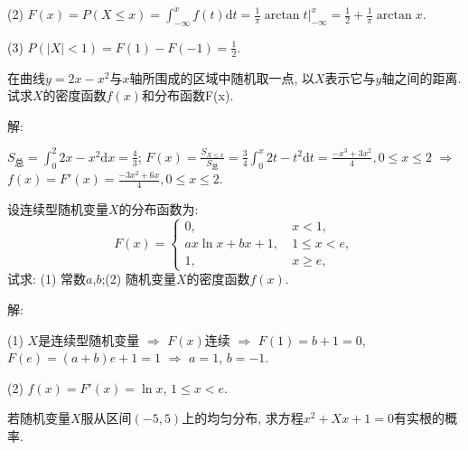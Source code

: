 \documentclass[standard]{ExBook}
\renewenvironment{shaded}{%
  \def\FrameCommand{\fboxsep=\FrameSep \colorbox{shadecolor}}%
  \MakeFramed{\advance\hsize-\width \FrameRestore}%
}{%
  \endMakeFramed
}
\begin{document}
\begin{qitems}
(2) $F(x)=P(X \leq x)=\displaystyle\int_{-\infty}^{x}f(t)\mathrm{d}t=\frac{1}{\pi}\arctan t\big|_{-\infty}^{x}=\frac{1}{2}+\frac{1}{\pi}\arctan x$.

(3) $P(|X| < 1)=F(1)-F(-1)=\displaystyle\frac{1}{2}$.

\vspace{2.5cm-5em}

    \begin{bbox}
    \begin{shaded}
        \qitem
在曲线$y=2x-x^2$与$x$轴所围成的区域中随机取一点, 以$X$表示它与$y$轴之间的距离. 试求$X$的密度函数$f(x)$和分布函数F(x).
    \end{shaded}
    \end{bbox}

\vspace{\dimexpr2.5cm-5em\relax}

解: 

$S_{\text{总}}=\displaystyle\int_{0}^{2}2x-x^2\mathrm{d}x=\frac{4}{3}$; $F(x)=\displaystyle\frac{S_{X\leq x}}{S_{\text{总}}}=\frac{3}{4}\int_{0}^{x}2t-t^2\mathrm{d}t=\frac{-x^3+3x^2}{4},0\leq x\leq 2$ $\Longrightarrow$ $f(x)=F'(x)=\displaystyle\frac{-3x^2+6x}{4},0\leq x\leq 2$.

\vspace{2.5cm-5em}

    \begin{bbox}
    \begin{shaded}
        \qitem
设连续型随机变量$X$的分布函数为:
$$
    F(x)=
    \left\{
    \begin{array}{ll}
        0,\ &x < 1,\\
        ax\ln x+bx+1,\ &1 \leq x < e,\\
        1,\ &x \geq e,
    \end{array}
    \right.
$$
试求: (1) 常数$a$,$b$;\qquad(2) 随机变量$X$的密度函数$f(x)$.
    \end{shaded}
    \end{bbox}

\vspace{\dimexpr2.5cm-5em\relax}

解: 

(1) $X$是连续型随机变量 $\Longrightarrow$ $F(x)$连续 $\Longrightarrow$ $F(1)=b+1=0$, $F(e)=(a+b)e+1=1$ $\Longrightarrow$ $a=1$, $b=-1$.

(2) $f(x)=F'(x)=\ln x$, $1 \leq x < e$.

\vspace{2.5cm-5em}

    \begin{bbox}
    \begin{shaded}
        \qitem
若随机变量$X$服从区间$(-5,5)$上的均匀分布, 求方程$x^2+Xx+1=0$有实根的概率.
    \end{shaded}
    \end{bbox}


\end{qitems}
\end{document}
